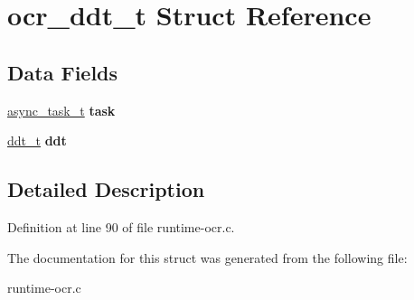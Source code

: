 \hypertarget{structocr__ddt__t}{\section{ocr\-\_\-ddt\-\_\-t Struct Reference}
\label{structocr__ddt__t}
}
\subsection*{Data Fields}
\begin{DoxyCompactItemize}
\item 
\hypertarget{structocr__ddt__t_ae5b7cddd7e4910f0cfa79de925e1c9ad}{\hyperlink{structasync__task__t}{async\-\_\-task\-\_\-t} {\bfseries task}}\label{structocr__ddt__t_ae5b7cddd7e4910f0cfa79de925e1c9ad}

\item 
\hypertarget{structocr__ddt__t_a30cf4ae807ad4ccbf4d677430976612d}{\hyperlink{structddt__t}{ddt\-\_\-t} {\bfseries ddt}}\label{structocr__ddt__t_a30cf4ae807ad4ccbf4d677430976612d}

\end{DoxyCompactItemize}


\subsection{Detailed Description}


Definition at line 90 of file runtime-\/ocr.\-c.



The documentation for this struct was generated from the following file\-:\begin{DoxyCompactItemize}
\item 
runtime-\/ocr.\-c\end{DoxyCompactItemize}
